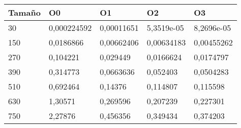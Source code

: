 \begin{tabular}{|l|l|l|l|l|}
	\hline
	Tamaño & O0 & O1 & O2 & O3 \\
	\hline
	\hline
	30 & 0,000224592 & 0,00011651 & 5,3519e-05 & 8,2696e-05 \\
	\hline
	150 & 0,0186866 & 0,00662406 & 0,00634183 & 0,00455262 \\
	\hline
	270 & 0,104221 & 0,029449 & 0,0166624 & 0,0174797 \\
	\hline
	390 & 0,314773 & 0,0663636 & 0,052403 & 0,0504283 \\
	\hline
	510 & 0,692464 & 0,14376 & 0,114807 & 0,115598 \\
	\hline
	630 & 1,30571 & 0,269596 & 0,207239 & 0,227301 \\
	\hline
	750 & 2,27876 & 0,456356 & 0,349434 & 0,374203 \\
	\hline
\end{tabular}
